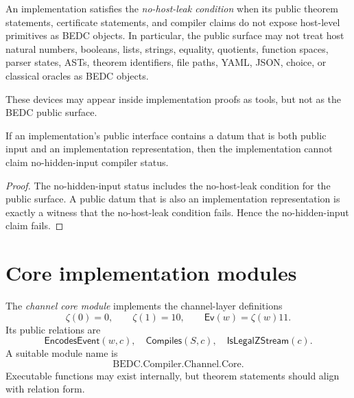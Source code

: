 \begin{definition}
\label{def:implementation-interface-no-host-leak-condition}
An implementation satisfies the \emph{no-host-leak condition} when its public theorem statements, certificate statements, and compiler claims do not expose host-level primitives as BEDC objects. In particular, the public surface may not treat host natural numbers, booleans, lists, strings, equality, quotients, function spaces, parser states, ASTs, theorem identifiers, file paths, YAML, JSON, choice, or classical oracles as BEDC objects.

These devices may appear inside implementation proofs as tools, but not as the BEDC public surface.
\end{definition}

\begin{theorem}
\label{thm:implementation-interface-host-leak-invalidates}
If an implementation's public interface contains a datum that is both public input and an implementation representation, then the implementation cannot claim no-hidden-input compiler status.
\end{theorem}

\begin{proof}
The no-hidden-input status includes the no-host-leak condition for the public surface. A public datum that is also an implementation representation is exactly a witness that the no-host-leak condition fails. Hence the no-hidden-input claim fails.
\end{proof}

\section{Core implementation modules}
\label{sec:implementation-interface-core-modules}

\begin{definition}
\label{def:implementation-interface-channel-core}
The \emph{channel core module} implements the channel-layer definitions
$$
  \zeta(0)=0,\qquad \zeta(1)=10,
  \qquad
  \mathsf{Ev}(w)=\zeta(w)11.
$$
Its public relations are
$$
  \mathsf{EncodesEvent}(w,c),\quad
  \mathsf{Compiles}(S,c),\quad
  \mathsf{IsLegalZStream}(c).
$$
A suitable module name is
$$
  \mathrm{BEDC.Compiler.Channel.Core}.
$$
Executable functions may exist internally, but theorem statements should align with relation form.
\end{definition}

